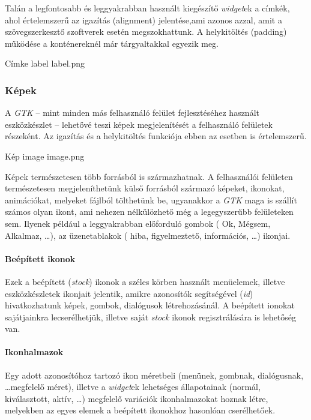 Talán a legfontosabb és leggyakrabban használt kiegészítő \textit{widget}ek a címkék, ahol értelemszerű az igazítás (alignment) jelentése,ami azonos azzal, amit a szövegszerkesztő szoftverek esetén megszokhattunk. A helykitöltés (padding) működése a konténereknél már tárgyaltakkal egyezik meg.

{Címke\cite{gtkref}}
{label}
{label.png}

\subsubsection{Képek}

A \textit{GTK} -- mint minden más felhasználó felület fejlesztéséhez használt eszközkészlet -- lehetővé teszi képek megjelenítését a felhasználó felületek részeként. Az igazítás és a helykitöltés funkciója ebben az esetben is értelemszerű.

{Kép\cite{gtkref}}
{image}
{image.png}

Képek természetesen több forrásból is származhatnak. A felhasználói felületen természetesen megjeleníthetünk külső forrásból származó képeket, ikonokat, animációkat, melyeket fájlból tölthetünk be, ugyanakkor a \textit{GTK} maga is szállít számos olyan ikont, ami nehezen nélkülözhető még a legegyszerűbb felületeken sem. Ilyenek például a leggyakrabban előforduló gombok ( Ok, Mégsem, Alkalmaz, \dots ), az üzenetablakok ( hiba, figyelmeztető, információs, \dots ) ikonjai.

\paragraph{Beépített ikonok}

Ezek a beépített (\textit{stock}) ikonok a széles körben használt menüelemek, illetve eszközkészletek ikonjait jelentik, amikre azonosítók segítségével (\textit{id}) hivatkozhatunk képek, gombok, dialógusok létrehozásánál. A beépített ionokat sajátjainkra lecserélhetjük, illetve saját \textit{stock} ikonok regisztrálására is lehetőség van.

\paragraph{Ikonhalmazok}

Egy adott azonosítóhoz tartozó ikon méretbeli (menünek, gombnak, dialógusnak, \dots megfelelő méret), illetve a \textit{widget}ek lehetséges állapotainak (normál, kiválasztott, aktív,  \dots ) megfelelő variációk ikonhalmazokat hoznak létre, melyekben az egyes elemek a beépített ikonokhoz hasonlóan cserélhetőek.

